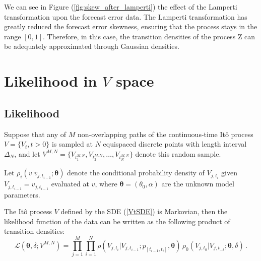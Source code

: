 \documentclass[11pt]{article}
\begin{document}

We can see in Figure (\ref{fig:skew_after_lamperti}) the effect of the Lamperti transformation upon the forecast error data. 
The Lamperti transformation has greatly reduced the forecast error skewness, ensuring that the process stays in the range $[0,1]$. Therefore, in this case, the transition densities of the process Z can be adequately approximated through Gaussian densities.

\section{Likelihood in $V$ space} \label{Section_4}

\subsection{Likelihood}

Suppose that any of $M$ non-overlapping paths of the continuous-time It\^{o} process $V = \{ V_t, t >0 \}$ is sampled at $N$ equispaced discrete points with length interval $\Delta_N$, and let $ V^{M,N}=\{ V_{t_1^{M,N}} , V_{t_2^{M,N}} ,\ldots , V_{t_N^{M,N}} \}$ denote this random sample. 

Let $\rho_i(v \vert v_{j, t_{i-1}} ; \bm{\theta})$ denote the conditional probability density of $V_{j, t_i}$ given $V_{j, t_{i-1}} = v_{j, t_{i-1}}$ evaluated at $v$, where $\bm{\theta} = (\theta_0, \alpha)$ are the unknown model parameters.

The It\^{o} process $V$ defined by the SDE (\ref{VtSDE}) is Markovian, then the likelihood function of the data can be written as the following product of transition densities:  
\begin{equation}
\mathcal{L}(\bm{\theta},\delta; V^{M,N}) = \prod\limits_{j=1}^M \prod\limits_{i=1}^N \rho ( {V_{j, t_i}| V_{j, t_{i-1}}} ; p_{[t_{i-1}, t_{i}]},  \bm{\theta} )  \, \rho_0 (V_{j, t_0}|V_{j, t_{-\delta}};\bm{\theta},\delta) \,.
\label{likelihood}
\end{equation}
\end{document}
